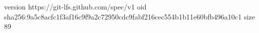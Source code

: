 version https://git-lfs.github.com/spec/v1
oid sha256:9a5c8acfc1f3af16c9f9a2c72950cdc9fabf216cec554b1b11e60bfb496a10c1
size 89
